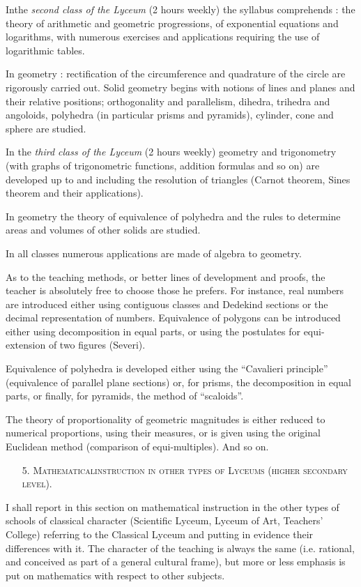 In\pageoriginale the {\em second class of the Lyceum} (2 hours weekly) the syllabus comprehends : the theory of arithmetic and geometric progressions, of exponential equations and logarithms, with numerous exercises and applications requiring the use of logarithmic tables.

In geometry : rectification of the circumference and quadrature of the circle are rigorously carried out. Solid geometry begins with notions of lines and planes and their relative positions; orthogonality and parallelism, dihedra, trihedra and angoloids, polyhedra (in particular prisms and pyramids), cylinder, cone and sphere are studied.

In the {\em third class of the Lyceum} (2 hours weekly) geometry and trigonometry (with graphs of trigonometric functions, addition formulas and so on) are developed up to and including the resolution of triangles (Carnot theorem, Sines theorem and their applications).

In geometry the theory of equivalence of polyhedra and the rules to determine areas and volumes of other solids are studied.

In all classes numerous applications are made of algebra to geometry.

As to the teaching methods, or better lines of development and proofs, the teacher is absolutely free to choose those he prefers. For instance, real numbers are introduced either using contiguous classes and Dedekind sections or the decimal representation of numbers. Equivalence of polygons can be introduced either using decomposition in equal parts, or using the postulates for equi-extension of two figures (Severi).

Equivalence of polyhedra is developed either using the ``Cavalieri principle'' (equivalence of parallel plane sections) or, for prisms, the decomposition in equal parts, or finally, for pyramids, the method of ``scaloids''.

The theory of proportionality of geometric magnitudes is either reduced to numerical proportions, using their measures, or is given using the original Euclidean method (comparison of equi-multiples). And so on.

\begin{itemize}
\item[5.] \textsc{Mathematical\pageoriginale instruction in other types of Lyceums (higher secondary level).}
\end{itemize}

I shall report in this section on mathematical instruction in the other types of schools of classical character (Scientific Lyceum, Lyceum of Art, Teachers' College) referring to the Classical Lyceum and putting in evidence their differences with it. The character of the teaching is always the same (i.e. rational, and conceived as part of a general cultural frame), but more or less emphasis is put on mathematics with respect to other subjects.

